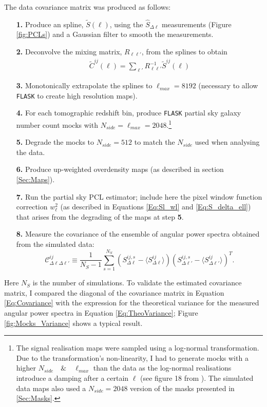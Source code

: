 \qquad The data covariance matrix was produced as follows:

\begin{enumerate}
\item[\textbf{1.}] Produce an spline, $\tilde{S}(\ell)$, using the $\hat{S}_{\Delta\ell}$ measurements (Figure \ref{fig:PCLs}) and a Gaussian filter to smooth the measurements.
\item[\textbf{2.}] Deconvolve the mixing matrix, $R_{\ell\ell'}$, from the splines to obtain
\begin{align}
\tilde{C}^{ij}(\ell) = \sum_{\ell'}R_{\ell\ell'}^{-1}\tilde{S}^{ij}(\ell)
\end{align}
\item[\textbf{3.}] Monotonically extrapolate the splines to $\ell_{max} = 8192$ (necessary to allow \texttt{FLASK} to create high resolution \healpix maps).
\item[\textbf{4.}] For each tomographic redshift bin, produce \texttt{FLASK} partial sky galaxy number count mocks with $N_{side} = \ell_{max} = 2048$.\footnote{The signal realisation maps were sampled using a log-normal transformation. Due to the transformation's non-linearity, I had to generate mocks with a higher $N_{side} \quad \& \quad\ell_{max}$ than the data as the log-normal realisations introduce a damping after a certain $\ell$ (see figure 18 from \cite{Flask2016}). The simulated data maps also used a $N_{side}=2048$ version of the masks presented in \ref{Sec:Masks}.}
\item[\textbf{5.}] Degrade the mocks to $N_{side}=512$ to match the $N_{side}$ used when analysing the data.
\item[\textbf{6.}] Produce up-weighted overdensity maps (as described in section \ref{Sec:Maps}).
\item[\textbf{7.}]Run the partial sky PCL estimator; include here the pixel window function correction $w_{\ell}^2$ (as described in Equations \eqref{Eq:Sl_wl} and \eqref{Eq:S_delta_ell}) that arises from the degrading of the maps at step \textbf{5}.
\item[\textbf{8.}] Measure the covariance of the ensemble of angular power spectra obtained from the simulated data:
\begin{equation}
\mathcal{C}^{ij}_{\Delta\ell\Delta\ell'} \equiv \frac{1}{N_S-1}\sum^{N_S}_{s=1}\left(S_{\Delta\ell}^{ij,s} - \langle S_{\Delta\ell}^{ij} \rangle \right)\left(S_{\Delta\ell'}^{ij,s} - \langle S_{\Delta\ell'}^{ij} \rangle \right)^T.
\label{Eq:Covariance}
\end{equation}
\end{enumerate}
Here $N_S$ is the number of simulations.
To validate the estimated covariance matrix, I compared the diagonal of the covariance matrix in Equation \eqref{Eq:Covariance} with the expression for the theoretical variance for the measured angular power spectra in Equation \eqref{Eq:TheoVariance}; Figure \ref{fig:Mocks_Variance} shows a typical result.

